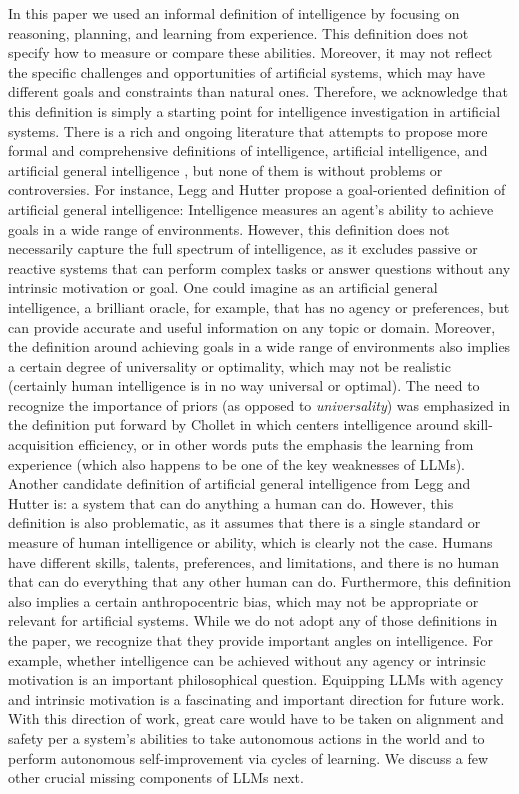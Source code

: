 In this paper we used an informal definition of intelligence by focusing on reasoning, planning, and learning from experience. This definition does not specify how to measure or compare these abilities. Moreover, it may not reflect the specific challenges and opportunities of artificial systems, which may have different goals and constraints than natural ones. Therefore, we acknowledge that this definition is simply a starting point for intelligence investigation in artificial systems. There is a rich and ongoing literature that attempts to propose more formal and comprehensive definitions of intelligence, artificial intelligence, and artificial general intelligence \cite{goertzel2014artificial, chollet2019measure}, but none of them is without problems or controversies. For instance, Legg and Hutter \cite{legg2008machine} propose a goal-oriented definition of artificial general intelligence: Intelligence measures an agent’s ability to achieve goals in a wide range of environments. However, this definition does not necessarily capture the full spectrum of intelligence, as it excludes passive or reactive systems that can perform complex tasks or answer questions without any intrinsic motivation or goal. One could imagine as an artificial general intelligence, a brilliant oracle, for example, that has no agency or preferences, but can provide accurate and useful information on any topic or domain. Moreover, the definition around achieving goals in a wide range of environments also implies a certain degree of universality or optimality, which may not be realistic (certainly human intelligence is in no way universal or optimal). The need to recognize the importance of priors (as opposed to {\em universality}) was emphasized in the definition put forward by Chollet in \cite{chollet2019measure} which centers intelligence around skill-acquisition efficiency, or in other words puts the emphasis the learning from experience (which also happens to be one of the key weaknesses of LLMs). Another candidate definition of artificial general intelligence from Legg and Hutter \cite{legg2007universal} is: a system that can do anything a human can do. However, this definition is also problematic, as it assumes that there is a single standard or measure of human intelligence or ability, which is clearly not the case. Humans have different skills, talents, preferences, and limitations, and there is no human that can do everything that any other human can do. Furthermore, this definition also implies a certain anthropocentric bias, which may not be appropriate or relevant for artificial systems. While we do not adopt any of those definitions in the paper, we recognize that they provide important angles on intelligence. For example, whether intelligence can be achieved without any agency or intrinsic motivation is an important philosophical question. Equipping LLMs with agency and intrinsic motivation is a fascinating and important direction for future work. With this direction of work, great care would have to be taken on alignment and safety per a system's abilities to take autonomous actions in the world and to perform autonomous self-improvement via cycles of learning. We discuss a few other crucial missing components of LLMs next.

